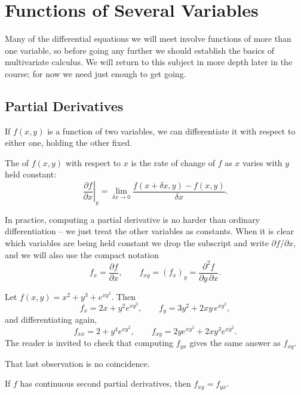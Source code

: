\section{Functions of Several Variables}

Many of the differential equations we will meet involve functions of more than one variable, so before going any further we should establish the basics of multivariate calculus. We will return to this subject in more depth later in the course; for now we need just enough to get going.

\subsection{Partial Derivatives}

If $f(x, y)$ is a function of two variables, we can differentiate it with respect to either one, holding the other fixed.

\begin{definition}
	The  of $f(x, y)$ with respect to $x$ is the rate of change of $f$ as $x$ varies with $y$ held constant:
	$$
	\left.\frac{\partial f}{\partial x}\right|_y = \lim_{\delta x \to 0} \frac{f(x + \delta x, y) - f(x, y)}{\delta x}.
	$$
\end{definition}

In practice, computing a partial derivative is no harder than ordinary differentiation -- we just treat the other variables as constants. When it is clear which variables are being held constant we drop the subscript and write $\partial f/\partial x$, and we will also use the compact notation
$$
f_x = \frac{\partial f}{\partial x}, \qquad f_{xy} = (f_x)_y = \frac{\partial^2 f}{\partial y \, \partial x}.
$$

\begin{example}
	Let $f(x, y) = x^2 + y^3 + e^{x y^2}$. Then
	$$
	f_x = 2x + y^2 e^{xy^2}, \qquad f_y = 3y^2 + 2xy \, e^{xy^2},
	$$
	and differentiating again,
	$$
	f_{xx} = 2 + y^4 e^{xy^2}, \qquad f_{xy} = 2y e^{xy^2} + 2x y^3 e^{xy^2}.
	$$
	The reader is invited to check that computing $f_{yx}$ gives the same answer as $f_{xy}$.
\end{example}

That last observation is no coincidence.

\begin{theorem}
	If $f$ has continuous second partial derivatives, then $f_{xy} = f_{yx}$.
\end{theorem}

